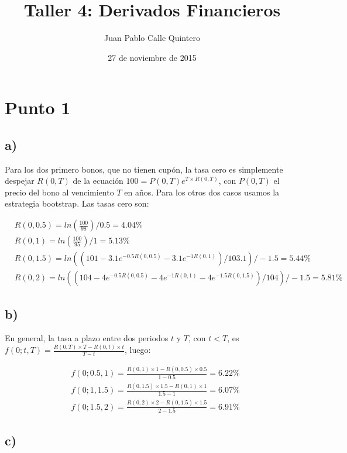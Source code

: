 \documentclass{tufte-handout}
\title{Taller 4: Derivados Financieros}
\author{Juan Pablo Calle Quintero}
\date{27 de noviembre de 2015}
\begin{document}
\maketitle

\section*{Punto 1}

\subsection*{a)}

Para los dos primero bonos, que no tienen cupón, la tasa cero es simplemente despejar $R(0,T)$ de la ecuación $100 = P(0,T) e^{T\times R(0,T)}$, con $P(0,T)$ el precio del bono al vencimiento $T$ en años. Para los otros dos casos usamos la estrategia bootstrap. Las tasas cero son:

\begin{align*}
& R(0,0.5)=ln\left(\frac{100}{98}\right) / 0.5 = 4.04 \% \\
& R(0,1)=ln \left(\frac{100}{95}\right) / 1 = 5.13 \% \\
& R(0,1.5) = ln((101 - 3.1 e^{-0.5 R(0,0.5)} - 3.1 e^{-1 R(0,1)}) / 103.1) / -1.5 = 5.44 \% \\
& R(0,2) = ln((104 - 4 e^{-0.5 R(0,0.5)} - 4 e^{-1 R(0,1)} - 4 e^{-1.5 R(0,1.5)}) / 104) / -1.5 = 5.81 \%
\end{align*}

\subsection*{b)}

En general, la tasa a plazo entre dos periodos $t$ y $T$, con $t < T$, es $f(0;t,T) = \frac{R(0,T)\times T-R(0,t)\times t}{T-t}$, luego:

\begin{align*}
& f(0;0.5,1)= \frac{R(0,1) \times 1 - R(0,0.5) \times 0.5}{1-0.5} = 6.22 \% \\
& f(0;1,1.5)= \frac{R(0,1.5) \times 1.5 - R(0,1) \times 1}{1.5-1} = 6.07 \% \\
& f(0;1.5,2) = \frac{R(0,2) \times 2 - R(0,1.5) \times 1.5}{2-1.5} = 6.91 \% 
\end{align*}

\subsection*{c)}
\end{document}
